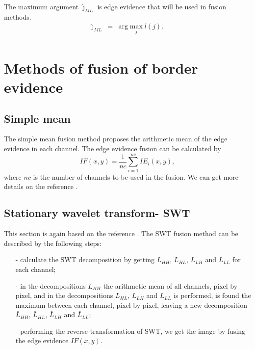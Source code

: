 \documentclass[conference]{IEEEtran}
\begin{document}
{{{{The maximum argument $\widehat{\jmath}_{ML}$ is edge evidence that will be used in fusion methods.
\begin{equation*}
\begin{array}{rcl}
	\widehat{\jmath}_{ML}&=&\text{arg}\max\limits_{j}l(j).  \\
\end{array}
\end{equation*}
\section{Methods of fusion of border evidence}\label{sec_06}
\subsection{Simple mean}
The simple mean fusion method proposes the arithmetic mean of the edge evidence in each channel. The edge evidence fusion can be calculated by
\begin{equation}
	IF(x,y)=\frac{1}{nc}\sum_{i=1}^{nc}IE_i(x,y),
\end{equation}
where $nc$ is the number of channels to be used in the fusion. We can get more details on the reference \cite{mit}.
\subsection{Stationary wavelet transform- SWT} 
This section is again based on the reference \cite{n_r}. The SWT fusion method can be described by the following steps:
\begin{itemize}
\item[-] calculate the SWT decomposition by getting $L_{HH}$, $L_{HL}$, $L_{LH}$ and $L_{LL}$ for each channel;
\item[-] in the decompositions $L_{HH}$ the arithmetic mean of all channels, pixel by pixel, and in the decompositions $L_{HL}$, $L_{LH}$ and $L_{LL}$ is performed, is found the maximum between each channel, pixel by pixel, leaving a new decomposition $\bar{L}_{HH}$, $\bar{L}_{HL}$, $\bar{L}_{LH}$ and $\bar{L}_{LL}$;
\item[-] performing the reverse transformation of SWT, we get the image by fusing the edge evidence $IF(x,y)$.  
\end{itemize}

}}}}
\end{document}
